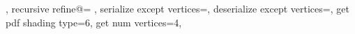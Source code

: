 {{		%
		\expandafter\pgfplotsplothandlermesh@setnextvertex\expandafter{\pgfplotspatchclass@rect@A}%
		\expandafter\pgfplotsplothandlermesh@setnextvertex\expandafter{\pgfplotspatchclass@rect@B}%
		\expandafter\pgfplotsplothandlermesh@setnextvertex\expandafter{\pgfplotspatchclass@rect@M}%
		\expandafter\pgfplotsplothandlermesh@setnextvertex\expandafter{\pgfplotspatchclass@rect@B}%
		\expandafter\pgfplotsplothandlermesh@setnextvertex\expandafter{\pgfplotspatchclass@rect@C}%
		\expandafter\pgfplotsplothandlermesh@setnextvertex\expandafter{\pgfplotspatchclass@rect@M}%
		\expandafter\pgfplotsplothandlermesh@setnextvertex\expandafter{\pgfplotspatchclass@rect@D}%
		\expandafter\pgfplotsplothandlermesh@setnextvertex\expandafter{\pgfplotspatchclass@rect@A}%
		\expandafter\pgfplotsplothandlermesh@setnextvertex\expandafter{\pgfplotspatchclass@rect@M}%
		\expandafter\pgfplotsplothandlermesh@setnextvertex\expandafter{\pgfplotspatchclass@rect@C}%
		\expandafter\pgfplotsplothandlermesh@setnextvertex\expandafter{\pgfplotspatchclass@rect@D}%
		\expandafter\pgfplotsplothandlermesh@setnextvertex\expandafter{\pgfplotspatchclass@rect@M}%
		\let\pgfplotsplothandlermesh@patchclass=\pgfplotsplothandlermesh@patchclass@
	},%
	recursive refine@={%
	},%
	serialize except vertices=\let\pgfplotsretval\pgfutil@empty,%
	deserialize except vertices=,
	get pdf shading type=6,
	get num vertices=4,
}%

